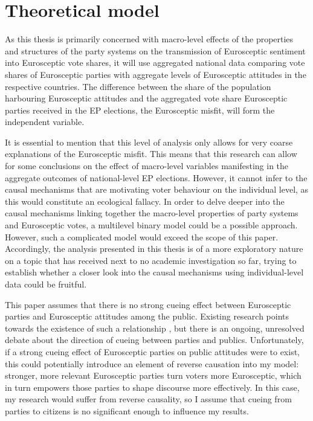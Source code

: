 \chapter{Theoretical model}
As this thesis is primarily concerned with macro-level effects of the properties and structures of the party systems on the transmission of Eurosceptic sentiment into Eurosceptic vote shares, it will use aggregated national data comparing vote shares of Eurosceptic parties with aggregate levels of Eurosceptic attitudes in the respective countries. The difference between the share of the population harbouring Eurosceptic attitudes and the aggregated vote share Eurosceptic parties received in the EP elections, the Eurosceptic misfit, will form the independent variable. 

It is essential to mention that this level of analysis only allows for very coarse explanations of the Eurosceptic misfit. This means that this research can allow for some conclusions on the effect of macro-level variables manifesting in the aggregate outcomes of national-level EP elections. However, it cannot infer to the causal mechanisms that are motivating voter behaviour on the individual level, as this would constitute an ecological fallacy. In order to delve deeper into the causal mechanisms linking together the macro-level properties of party systems and Eurosceptic votes, a multilevel binary model could be a possible approach. However, such a complicated model would exceed the scope of this paper.
Accordingly, the analysis presented in this thesis is of a more exploratory nature on a topic that has received next to no academic investigation so far, trying to establish whether a closer look into the causal mechanisms using individual-level data could be fruitful.

This paper assumes that there is no strong cueing effect between Eurosceptic parties and Eurosceptic attitudes among the public. Existing research points towards the existence of such a relationship \cite{DeVries2009,Lubbers2010}, but there is an ongoing, unresolved debate about the direction of cueing between parties and publics. Unfortunately, if a strong cueing effect of Eurosceptic parties on public attitudes were to exist, this could potentially introduce an element of reverse causation into my model: stronger, more relevant Eurosceptic parties turn voters more Eurosceptic, which in turn empowers those parties to shape discourse more effectively. In this case, my research would suffer from reverse causality, so I assume that cueing from parties to citizens is no significant enough to influence my results. 

